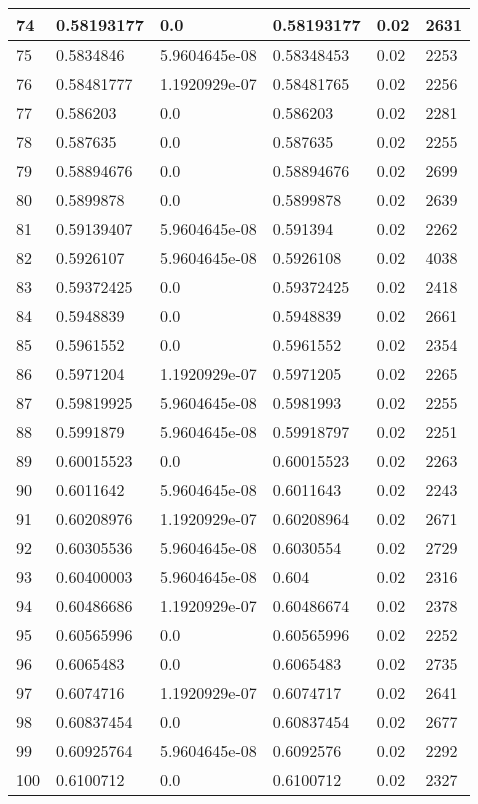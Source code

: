 \begin{longtable}{|l|l|l|l|l|l|}
74 & 0.58193177 & 0.0 & 0.58193177 & 0.02 & 2631 \\ \hline 
75 & 0.5834846 & 5.9604645e-08 & 0.58348453 & 0.02 & 2253 \\ \hline 
76 & 0.58481777 & 1.1920929e-07 & 0.58481765 & 0.02 & 2256 \\ \hline 
77 & 0.586203 & 0.0 & 0.586203 & 0.02 & 2281 \\ \hline 
78 & 0.587635 & 0.0 & 0.587635 & 0.02 & 2255 \\ \hline 
79 & 0.58894676 & 0.0 & 0.58894676 & 0.02 & 2699 \\ \hline 
80 & 0.5899878 & 0.0 & 0.5899878 & 0.02 & 2639 \\ \hline 
81 & 0.59139407 & 5.9604645e-08 & 0.591394 & 0.02 & 2262 \\ \hline 
82 & 0.5926107 & 5.9604645e-08 & 0.5926108 & 0.02 & 4038 \\ \hline 
83 & 0.59372425 & 0.0 & 0.59372425 & 0.02 & 2418 \\ \hline 
84 & 0.5948839 & 0.0 & 0.5948839 & 0.02 & 2661 \\ \hline 
85 & 0.5961552 & 0.0 & 0.5961552 & 0.02 & 2354 \\ \hline 
86 & 0.5971204 & 1.1920929e-07 & 0.5971205 & 0.02 & 2265 \\ \hline 
87 & 0.59819925 & 5.9604645e-08 & 0.5981993 & 0.02 & 2255 \\ \hline 
88 & 0.5991879 & 5.9604645e-08 & 0.59918797 & 0.02 & 2251 \\ \hline 
89 & 0.60015523 & 0.0 & 0.60015523 & 0.02 & 2263 \\ \hline 
90 & 0.6011642 & 5.9604645e-08 & 0.6011643 & 0.02 & 2243 \\ \hline 
91 & 0.60208976 & 1.1920929e-07 & 0.60208964 & 0.02 & 2671 \\ \hline 
92 & 0.60305536 & 5.9604645e-08 & 0.6030554 & 0.02 & 2729 \\ \hline 
93 & 0.60400003 & 5.9604645e-08 & 0.604 & 0.02 & 2316 \\ \hline 
94 & 0.60486686 & 1.1920929e-07 & 0.60486674 & 0.02 & 2378 \\ \hline 
95 & 0.60565996 & 0.0 & 0.60565996 & 0.02 & 2252 \\ \hline 
96 & 0.6065483 & 0.0 & 0.6065483 & 0.02 & 2735 \\ \hline 
97 & 0.6074716 & 1.1920929e-07 & 0.6074717 & 0.02 & 2641 \\ \hline 
98 & 0.60837454 & 0.0 & 0.60837454 & 0.02 & 2677 \\ \hline 
99 & 0.60925764 & 5.9604645e-08 & 0.6092576 & 0.02 & 2292 \\ \hline 
100 & 0.6100712 & 0.0 & 0.6100712 & 0.02 & 2327 \\ \hline 
\end{longtable}